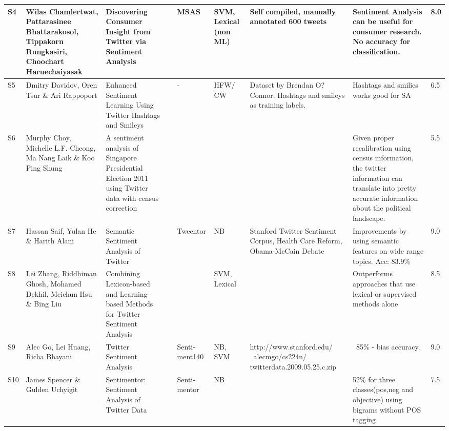 \begin{landscape}
\begin{supertabular}{|P{0.5cm}|P{2.8cm}|P{3.5cm}|P{0.6cm}|P{1cm}|P{1cm}|P{3.3cm}|P{3cm}|P{0.5cm}|}
		S4 & Wilas Chamlertwat, Pattarasinee Bhattarakosol, Tippakorn Rungkasiri, Choochart Haruechaiyasak & Discovering Consumer Insight from Twitter via Sentiment Analysis & \citeyear{chamlertwat2012discovering} & MSAS & SVM, Lexical (non ML) & Self compiled, manually annotated 600 tweets & Sentiment Analysis can be useful for consumer research. No accuracy for classification.  & 8.0 \\ \hline  
		
		S5 & Dmitry Davidov, Oren Tsur \& Ari Rappoport & Enhanced Sentiment Learning Using Twitter Hashtags and Smileys & \citeyear{davidov2010enhanced} & - & HFW/ CW & Dataset by Brendan O?Connor. Hashtags and smileys as training labels. & Hashtags and smilies works good for SA  & 6.5 \\ \hline  
		
		S6 & Murphy Choy, Michelle L.F. Cheong, Ma Nang Laik \& Koo Ping Shung & A sentiment analysis of Singapore Presidential Election 2011 using Twitter data with census correction & \citeyear{choy2011sentiment} &  &  &  & Given proper recalibration using census information, the twitter information can translate into pretty accurate information about the political landscape.  & 5.5 \\ \hline  
		
		S7 & Hassan Saif, Yulan He \& Harith Alani & Semantic Sentiment Analysis of Twitter & \citeyear{saif2012semantic} & Tweentor & NB & Stanford Twitter Sentiment Corpus, Health Care Reform, Obama-McCain Debate & Improvements by using semantic features on wide range topics. Acc: 83.9\%  & 9.0 \\ \hline  
		
		
		S8 & Lei Zhang, Riddhiman Ghosh, Mohamed Dekhil, Meichun Hsu \& Bing Liu & Combining Lexicon-based and Learning-based Methods for Twitter Sentiment Analysis & \citeyear{zhang2011combining} &  & SVM, Lexical &  & Outperforms approaches that use lexical or supervised methods alone  & 8.5 \\ \hline  
		
		S9 & Alec Go, Lei Huang, Richa Bhayani & Twitter Sentiment Analysis & \citeyear{article:go} & Senti-ment140 & NB, SVM & http://www.stanford.edu/ ~alecmgo/cs224n/ twitterdata.2009.05.25.c.zip & ~85\% - bias accuracy.  & 9.0  \\ \hline  
		
		
		S10 & James Spencer \& Gulden Uchyigit & Sentimentor: Sentiment Analysis of Twitter Data & \citeyear{spencer2012sentimentor} & Senti-mentor & NB &  & 52\% for three classes(pos,neg and objective) using bigrams without POS tagging  & 7.5 \\ \hline  
		

\end{supertabular}
\end{landscape}
